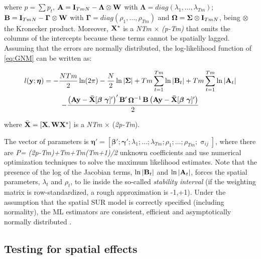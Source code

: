 \documentclass[article]{jss}
\begin{document}
where \(p=\sum p_t\), \({\bf A}={\bf I}_{TmN}-{\boldsymbol \Lambda} \otimes {\bf W}\) with \({\boldsymbol \Lambda}=diag(\lambda_1,\dots,\lambda_{Tm})\); \({\bf B}={\bf I}_{TmN}- {\boldsymbol \Gamma} \otimes {\bf W}\) with \({\boldsymbol \Gamma}=diag(\rho_1,\dots,\rho_{Tm})\) and \({\boldsymbol \Omega}={\boldsymbol \Sigma} \otimes {\bf I}_{TmN}\), being \(\otimes\) the Kronecker product. Moreover, \({\bf X}^*\) is a \emph{NTm} \(\times\) \emph{(p-Tm)} that omits the columns of the intercepts because these terms cannot be spatially lagged. Assuming that the errors are normally distributed, the log-likelihood function of \eqref{eq:GNM} can be written as:

\begin{multline}
l({\bf y};{\boldsymbol \eta})=-\frac{NTm}{2} \ln (2\pi)-\frac{N}{2} \ln |{\bf \Sigma}|+Tm\sum _{t=1}^{Tm}\ln|{\bf B}_t| +Tm\sum _{t=1}^{Tm}\ln|{\bf A}_t| \\
-\frac{\left({\bf Ay}-{\bf \bar{X}}[{\boldsymbol \beta} \ {\boldsymbol \gamma}]' \right)'{\bf B}'\mathop{{\bf \Omega}}\nolimits^{-1} {\bf B}\left({\bf Ay}-{\bf  \bar{X}}[{\boldsymbol \beta} \ {\boldsymbol \gamma}]' \right)}{2}
 \label{eq:Lik}
\end{multline}

where \(\bar{\textbf X}=[\textbf X,\bf W {\bf X}^*]\) is a \emph{NTm} \(\times\) (\emph{2p-Tm}).

The vector of parameters is \({\boldsymbol \eta}'=\left[{\boldsymbol \beta}';{\boldsymbol \gamma}';\lambda_{1}; \dots ;\lambda_{Tm};\rho_{1};\dots ;\rho_{Tm} ;\mathop{\sigma }\nolimits_{ij} \right]\), where there are \emph{P= (2p-Tm)+Tm+Tm(Tm+1)/2} unknown coefficients \citet{Wang2007} and \citet{Lopez2014} use numerical optimization techniques to solve the maximum likelihood estimates. Note that the presence of the log of the Jacobian terms, \(\ln|{\bf B}_t|\) and \(\ln|{\bf A}_t|\), forces the spatial parameters, \(\lambda_t\) and \(\rho_t\), to lie inside the so-called \emph{stability interval} (if the weighting matrix is row-standardized, a rough approximation is -1,+1). Under the assumption that the spatial SUR model is correctly specified (including normality), the ML estimators are consistent, efficient and asymptotically normally distributed \citep{Davidson1993}.

\hypertarget{testing}{%
\subsection{Testing for spatial effects}\label{testing}}
\end{document}
